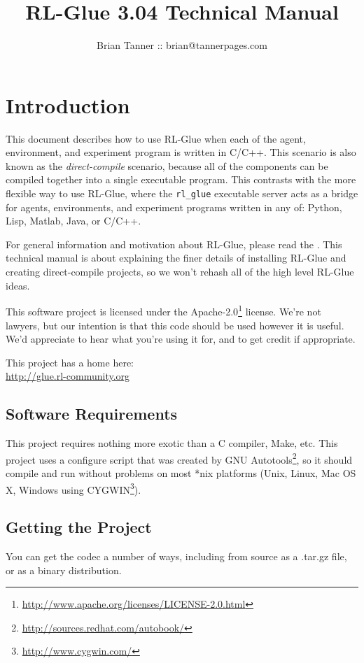 \documentclass[11pt]{article}
\title{RL-Glue 3.04 Technical Manual }
\author{Brian Tanner :: brian@tannerpages.com}
\date{}
\begin{document}
\maketitle
\tableofcontents

\section{Introduction}

This document describes how to use RL-Glue when each of the agent, environment, and experiment program is written in C/C++.  This scenario is also known as the \textit{direct-compile} scenario, because all of the
components can be compiled together into a single executable program.  This contrasts with the more flexible way to use RL-Glue, where the \texttt{rl\_glue} executable server acts as a bridge for agents, environments, and experiment 
programs written in any of: Python, Lisp, Matlab, Java, or C/C++.  

For general information and motivation about RL-Glue, please read the .  This technical manual is about explaining the finer details of installing RL-Glue and creating direct-compile projects, 
so we won't rehash all of the high level RL-Glue ideas.

This software project is licensed under the Apache-2.0\footnote{\url{http://www.apache.org/licenses/LICENSE-2.0.html}} license. We're not lawyers, but our intention is that this code 
should be used however it is useful.  We'd appreciate to hear what you're using it for, and to get credit if appropriate.

This project has a home here:\\
\url{http://glue.rl-community.org}



\subsection{Software Requirements}
This project requires nothing more exotic than a C compiler, Make, etc.  This project uses a configure script that was created by GNU 
Autotools\footnote{\url{http://sources.redhat.com/autobook/}}, so it should compile and run without problems 
on most *nix platforms (Unix, Linux, Mac OS X, Windows using CYGWIN\footnote{\url{http://www.cygwin.com/}}). 

\subsection{Getting the Project}
You can get the codec a number of ways, including from source as a .tar.gz file, or as a binary distribution.
\end{document}
